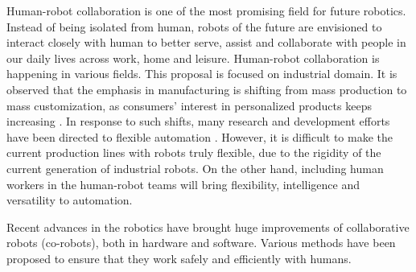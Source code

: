 Human-robot collaboration is one of the most promising field for future robotics. Instead of being isolated from human, robots of the future are envisioned to interact closely with human to better serve, assist and collaborate with people in our daily lives across work, home and leisure. Human-robot collaboration is happening in various fields. This proposal is focused on industrial domain. It is observed that the emphasis in manufacturing is shifting from mass production to mass customization, as consumers' interest in personalized products keeps increasing \cite{pine1999mass}. In response to such shifts, many research and development efforts have been directed to flexible automation \cite{hutchinson1982economic,jovane2003present}. However, it is difficult to make the current production lines with robots truly flexible, due to the rigidity of the current generation of industrial robots. On the other hand, including human workers in the human-robot teams will bring flexibility, intelligence and versatility to automation.


 Recent advances in the robotics have brought huge improvements of collaborative robots (co-robots), both in hardware and software. Various methods have been proposed to ensure that they work safely and efficiently with humans.  

